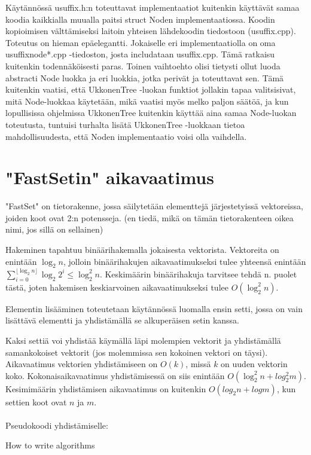\documentclass{article}
\begin{document}
        Käytännössä usuffix.h:n toteuttavat implementaatiot kuitenkin käyttävät samaa koodia kaikkialla muualla paitsi
        struct Noden implementaatiossa. Koodin kopioimisen välttämiseksi laitoin yhteisen lähdekoodin tiedostoon (usuffix.cpp).
        Toteutus on hieman epäelegantti. Jokaiselle eri implementaatiolla on oma usuffixnode*.cpp -tiedoston, josta 
        includataan usuffix.cpp. Tämä ratkaisu kuitenkin todennäköisesti paras. Toinen vaihtoehto olisi tietysti ollut
        luoda abstracti Node luokka ja eri luokkia, jotka perivät ja toteuttavat sen. Tämä kuitenkin vaatisi, että
        UkkonenTree -luokan funktiot jollakin tapaa valitsisivat, mitä Node-luokkaa käytetään, mikä vaatisi myös melko
        paljon säätöä, ja kun lopullisissa ohjelmissa UkkonenTree kuitenkin käyttää aina samaa Node-luokan toteutusta,
        tuntuisi turhalta lisätä UkkonenTree -luokkaan tietoa mahdollisuudesta, että Noden implementaatio voisi olla 
        vaihdella.
    
  \section{"FastSetin" aikavaatimus}

    "FastSet" on tietorakenne, jossa säilytetään elementtejä järjestetyissä vektoreissa, joiden koot ovat 2:n potensseja.  
    (en tiedä, mikä on tämän tietorakenteen oikea nimi, jos sillä on sellainen)

    Hakeminen tapahtuu binäärihakemalla jokaisesta vektorista. Vektoreita on enintään $\log_2n$, jolloin binäärihakujen 
    aikavaatimukseksi tulee yhteensä enintään $\sum_{i=0}^{\lfloor \log_2n \rfloor}{\log_2{2^i}}\leq \log_2^2 n$. Keskimäärin
    binäärihakuja tarvitsee tehdä n. puolet tästä, joten hakemisen keskiarvoinen aikavaatimukseksi tulee $O(\log_2^2 n)$.

    Elementin lisääminen toteutetaan käytännössä luomalla ensin setti, jossa on vain lisättävä elementti ja yhdistämällä 
    se alkuperäisen setin kanssa.
    
    Kaksi settiä voi yhdistää käymällä läpi molempien vektorit ja yhdistämällä samankokoiset vektorit (jos molemmissa sen
    kokoinen vektori on täysi). Aikavaatimus vektorien yhdistämiseen on $O(k)$, missä $k$ on uuden vektorin koko. 
    Kokonaisaikavaatimus yhdistämisessä on siis enintään $O(\log_2^2 n+log_2^2 m)$. Kesimimäärin yhdistämisen aikavaatimus 
    on kuitenkin $O(log_2 n + log m)$, kun settien koot ovat $n$ ja $m$.
    \\ \\
    Pseudokoodi yhdistämiselle: \\
    \begin{algorithm}[H]
        \caption{How to write algorithms}
    \end{algorithm}
    
\end{document}
